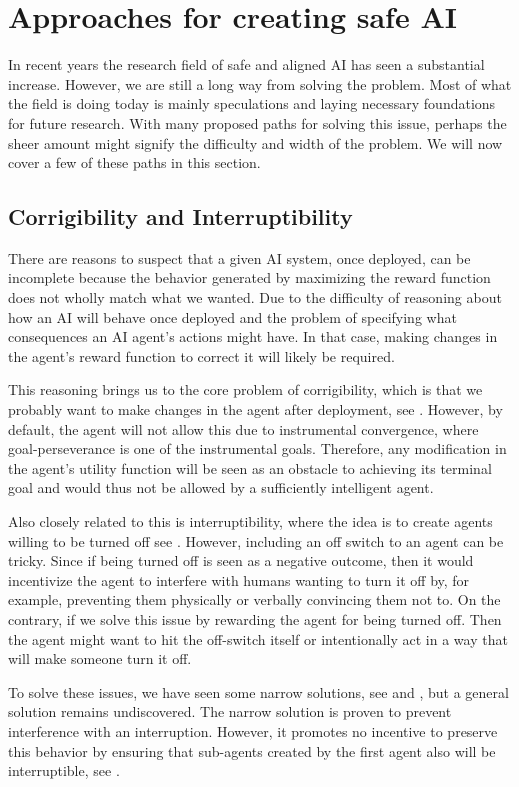 \documentclass[12pt,A4]{report}
\theoremstyle{definition}
\begin{document}
\section{Approaches for creating safe AI}
In recent years the research field of safe and aligned AI has seen a substantial increase. However, we are still a long way from solving the problem. Most of what the field is doing today is mainly speculations and laying necessary foundations for future research. With many proposed paths for solving this issue, perhaps the sheer amount might signify the difficulty and width of the problem. We will now cover a few of these paths in this section.


\subsection{Corrigibility and Interruptibility }
There are reasons to suspect that a given AI system, once deployed, can be incomplete because the behavior generated by maximizing the reward function does not wholly match what we wanted. Due to the difficulty of reasoning about how an AI will behave once deployed and the problem of specifying what consequences an AI agent's actions might have. In that case, making changes in the agent's reward function to correct it will likely be required.  

This reasoning brings us to the core problem of corrigibility, which is that we probably want to make changes in the agent after deployment, see \citet{Corrigibility}. However, by default, the agent will not allow this due to instrumental convergence, where goal-perseverance is one of the instrumental goals. Therefore, any modification in the agent's utility function will be seen as an obstacle to achieving its terminal goal and would thus not be allowed by a sufficiently intelligent agent. 

Also closely related to this is interruptibility, where the idea is to create agents willing to be turned off see \citet{Interruptible}. However, including an off switch to an agent can be tricky. Since if being turned off is seen as a negative outcome, then it would incentivize the agent to interfere with humans wanting to turn it off by, for example, preventing them physically or verbally convincing them not to. On the contrary, if we solve this issue by rewarding the agent for being turned off. Then the agent might want to hit the off-switch itself or intentionally act in a way that will make someone turn it off. 

To solve these issues, we have seen some narrow solutions, see \citet{Hadfield-Menell} and \citet{Carey}, but a general solution remains undiscovered. The narrow solution is proven to prevent interference with an interruption. However, it promotes no incentive to preserve this behavior by ensuring that sub-agents created by the first agent also will be interruptible, see \citet{co-founding}.  
\end{document}
